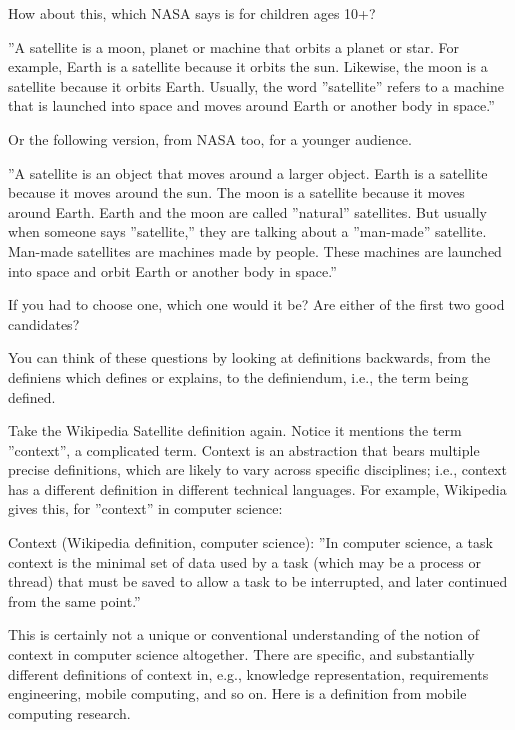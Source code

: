 \documentclass[graybox,envcountchap,sectrefs]{svmono}
\begin{document}
How about this, which NASA says is for children ages 10+?

\begin{svgraybox}
''A satellite is a moon, planet or machine that orbits a planet or star. For example, Earth is a satellite because it orbits the sun. Likewise, the moon is a satellite because it orbits Earth. Usually, the word ''satellite'' refers to a machine that is launched into space and moves around Earth or another body in space.'' \cite{nasa-satellite-58}
\end{svgraybox}

Or the following version, from NASA too, for a younger audience.

\begin{svgraybox}
''A satellite is an object that moves around a larger object. Earth is a satellite because it moves around the sun. The moon is a satellite because it moves around Earth. Earth and the moon are called ''natural'' satellites. But usually when someone says ''satellite,'' they are talking about a ''man-made'' satellite. Man-made satellites are machines made by people. These machines are launched into space and orbit Earth or another body in space.'' \cite{nasa-satellite-k4}
\end{svgraybox}

If you had to choose one, which one would it be? Are either of the first two good candidates?

You can think of these questions by looking at definitions backwards, from the definiens which defines or explains, to the definiendum, i.e., the term being defined.

Take the Wikipedia Satellite definition again. Notice it mentions the term ''context'', a complicated term. Context is an abstraction that bears multiple precise definitions, which are likely to vary across specific disciplines; i.e., context has a different definition in different technical languages. For example, Wikipedia gives this, for ''context'' in computer science:

\begin{svgraybox}
Context (Wikipedia definition, computer science): ''In computer science, a task context is the minimal set of data used by a task (which may be a process or thread) that must be saved to allow a task to be interrupted, and later continued from the same point.'' \cite{wikipedia-context-computing}
\end{svgraybox}

This is certainly not a unique or conventional understanding of the notion of context in computer science altogether. There are specific, and substantially different definitions of context in, e.g., knowledge representation, requirements engineering, mobile computing, and so on. Here is a definition from mobile computing research.
\end{document}

